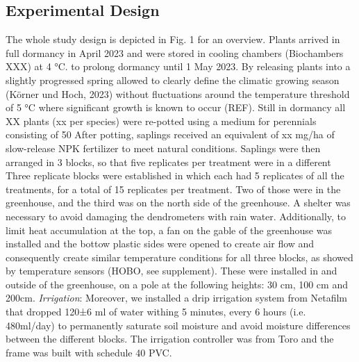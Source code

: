\documentclass{article}
\begin{document}
	\subsection*{Experimental Design}			The whole study design is depicted in Fig. 1 for an overview. Plants arrived in full dormancy in April 2023 and were stored in cooling chambers (Biochambers XXX) at 4 °C. to prolong dormancy until 1 May 2023. By releasing plants into a slightly progressed spring allowed to clearly define the climatic growing season (Körner und Hoch, 2023) without fluctuations around the temperature threshold of 5 °C where significant growth is known to occur (REF). 
	Still in dormancy all XX plants (xx per species) were re-potted using a medium for perennials consisting of 50%
	After potting, saplings received an equivalent of xx mg/ha of slow-release NPK fertilizer to meet natural conditions. Saplings were then arranged in 3 blocks, so that five replicates per treatment were in a different
	Three replicate blocks were established in which each had 5 replicates of all the treatments, for a total of 15 replicates per treatment. Two of those were in the greenhouse, and the third was on the north side of the greenhouse. A shelter was necessary to avoid damaging the dendrometers with rain water. Additionally, to limit heat accumulation at the top, a fan on the gable of the greenhouse was installed and the bottow plastic sides were opened to create air flow and consequently create similar temperature conditions for all three blocks, as showed by temperature sensors (HOBO, see supplement). These were installed in and outside of the greenhouse, on a pole at the following heights: 30 cm, 100 cm and 200cm. 
	\textit{Irrigation}:
	Moreover, we installed a drip irrigation system from Netafilm that dropped 120±6 ml of water withing 5 minutes, every 6 hours (i.e. 480ml/day) to permanently saturate soil moisture and avoid moisture differences between the different blocks. The irrigation controller was from Toro and the frame was built with schedule 40 PVC.
	
\end{document}
